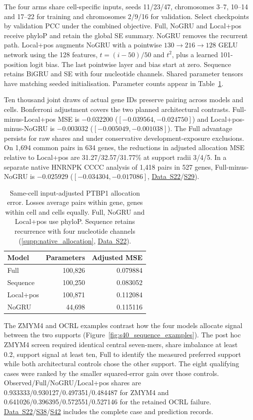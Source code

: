 \documentclass[11pt,a4paper]{article}
\newcommand{\tableid}[1]{\setcounter{table}{\numexpr#1-1\relax}}
\newcommand{\sr}[1]{\ref{#1}}
\newcommand{\fref}[1]{Figure~\ref{#1}}
\newcommand{\tref}[1]{Table~\ref{#1}}
\newcommand{\data}[1]{\hyperref[data:S#1]{Data~S#1}}
\newcommand{\sdata}[1]{\hyperref[data:S#1]{S#1}}
\begin{document}
The four arms share cell-specific inputs, seeds 11/23/47, chromosomes 3--7, 10--14 and 17--22 for training and chromosomes 2/9/16 for validation. Select checkpoints by validation PCC under the combined objective. Full, NoGRU and Local+pos receive phyloP and retain the global SE summary. NoGRU removes the recurrent path. Local+pos augments NoGRU with a pointwise $130\to216\to128$ GELU network using the 128 features, $t=(i-50)/50$ and $t^2$, plus a learned 101-position logit bias. The last pointwise layer and bias start at zero. Sequence retains BiGRU and SE with four nucleotide channels. Shared parameter tensors have matching seeded initialisation. Parameter counts appear in \tref{tab:primary_allocation}.

Ten thousand joint draws of actual gene IDs preserve pairing across models and cells. Bonferroni adjustment covers the two planned architectural contrasts. Full-minus-Local+pos MSE is $-0.032200$ ($[-0.039564,-0.024750]$) and Local+pos-minus-NoGRU is $-0.003032$ ($[-0.005049,-0.001038]$). The Full advantage persists for raw shares and under conservative development-exposure exclusions. On 1,694 common pairs in 634 genes, the reductions in adjusted allocation MSE relative to Local+pos are 31.27/32.57/31.77\% at support radii 3/4/5. In a separate native HNRNPK CCCC analysis of 1,418 pairs in 527 genes, Full-minus-NoGRU is $-0.025929$ ($[-0.034304,-0.017086]$, \data{22}/\sdata{29}). 

\tableid{12}
\begin{table}[H]
\centering
\caption{Same-cell input-adjusted PTBP1 allocation error. Losses average pairs within gene, genes within cell and cells equally. Full, NoGRU and Local+pos use phyloP. Sequence retains recurrence with four nucleotide channels (\sr{supp:native_allocation}, \data{22}).}
\label{tab:primary_allocation}
\small
\begin{tabular}{@{}lrr@{}}
\toprule
Model & Parameters & Adjusted MSE \\
\midrule
Full & 100,826 & 0.079884 \\
Sequence & 100,250 & 0.083052 \\
Local+pos & 100,871 & 0.112084 \\
NoGRU & 44,698 & 0.115116 \\
\bottomrule
\end{tabular}
\end{table}

The ZMYM4 and OCRL examples contrast how the four models allocate signal between the two supports (\fref{fig:s40_sequence_examples}). The post hoc ZMYM4 screen required identical central seven-mers, share imbalance at least 0.2, support signal at least ten, Full to identify the measured preferred support while both architectural controls chose the other support. The eight qualifying cases were ranked by the smaller squared-error gain over those controls. Observed/Full/NoGRU/Local+pos shares are 0.933333/0.930127/0.497351/0.484487 for ZMYM4 and 0.641026/0.396395/0.572551/0.527146 for the retained OCRL failure. \data{22}/\sdata{38}/\sdata{42} includes the complete case and prediction records.
\end{document}
